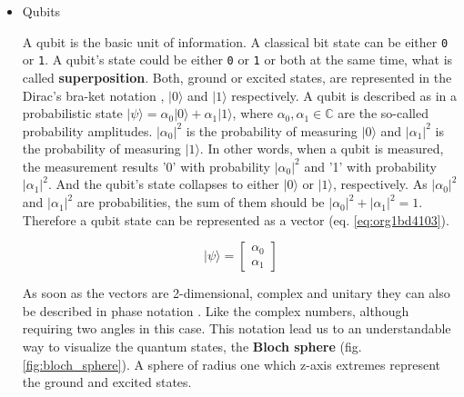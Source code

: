 \begin{itemize}
\item Qubits
\label{sec:org43c4649}


A qubit is the basic unit of information.
A classical bit state can be either \texttt{0} or \texttt{1}.
A qubit's state could be either \texttt{0} or \texttt{1} or both at the same time, what is called \textbf{superposition}.
Both, ground or excited states, are represented in the Dirac's bra-ket notation \cite{Nielsen_2009}, \(| 0 \rangle\) and \(| 1 \rangle\) respectively.
A qubit is described as in a probabilistic state \(| \psi \rangle = \alpha_0 | 0 \rangle + \alpha_1 | 1 \rangle\), where \(\alpha_0, \alpha_1 \in \mathbb{C}\) are the so-called probability amplitudes.
\(|\alpha_0|^2\) is the probability of measuring \(| 0 \rangle\) and \(|\alpha_1|^2\) is the probability of measuring \(| 1 \rangle\).
In other words, when a qubit is measured, the measurement results '0' with probability \(|\alpha_0|^2\) and '1' with probability \(|\alpha_1|^2\).
And the qubit's state collapses to either \(| 0 \rangle\) or \(| 1 \rangle\), respectively.
As \(|\alpha_0|^2\) and \(|\alpha_1|^2\)  are probabilities, the sum of them should be \(|\alpha_0|^2 + |\alpha_1|^2 = 1\).
Therefore a qubit state can be represented as a vector (eq. \ref{eq:org1bd4103}).

\begin{equation}
\label{eq:org1bd4103}
|\psi\rangle = \begin{bmatrix}\alpha_0 \\ \alpha_1 \end{bmatrix}
\end{equation}

As soon as the vectors are 2-dimensional, complex and unitary they can also be described in phase notation \cite{Nielsen_2009}.
Like the complex numbers, although requiring two angles in this case.
This notation lead us to an understandable way to visualize the quantum states, the \textbf{Bloch sphere} (fig. \ref{fig:bloch_sphere}).
A sphere of radius one which z-axis extremes represent the ground and excited states.


\end{itemize}
